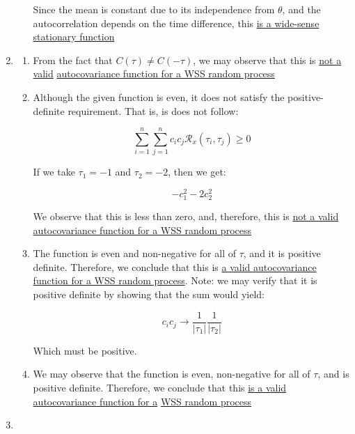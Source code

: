 \begin{enumerate}
\begin{enumerate}
        Since the mean is constant due to its independence from $\theta$, and the autocorrelation depends on the time difference, this \underline{is a wide-sense stationary function}

    \end{enumerate}

  \item

    \begin{enumerate}

      \item From the fact that $C(\tau)\neq C(-\tau)$, we may observe that this is \underline{not a valid} \underline{autocovariance function for a WSS random process}

      \item Although the given function is even, it does not satisfy the positive-definite requirement. That is, is does not follow:

        $$\sum_{i=1}^n\sum_{j=1}^n c_ic_j\mathcal{R}_x(\tau_i,\tau_j)\geq 0$$

        If we take $\tau_1=-1$ and $\tau_2=-2$, then we get:

        $$-c_1^2-2c_2^2$$

      We observe that this is less than zero, and, therefore, this is \underline{not a valid}\\ \underline{autocovariance function for a WSS random process}

      \item The function is even and non-negative for all of $\tau$, and it is positive definite. Therefore, we conclude that this is \underline{a valid autocovariance function for a WSS random process}. Note: we may verify that it is positive definite by showing that the sum would yield:

        $$c_ic_j\to \frac{1}{|\tau_1|}\frac{1}{|\tau_2|}$$

      Which must be positive.

      \item We may observe that the function is even, non-negative for all of $\tau$, and is positive definite. Therefore, we conclude that this \underline{is a valid autocovariance function for a} \underline{WSS random process}

    \end{enumerate}

  \item

    \begin{enumerate}


\end{enumerate}
\end{enumerate}
